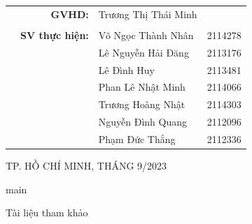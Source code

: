 \documentclass[a4paper]{article}
\begin{document}
\begin{titlepage}
\begin{table}[h]
\begin{tabular}{rrll}
\hspace{4cm} & \textbf{GVHD:} & Trương Thị Thái Minh \\
\\
& \textbf{SV thực hiện:} & Võ Ngọc Thành Nhân & 2114278 \\
& & Lê Nguyễn Hải Đăng & 2113176 \\
& & Lê Đình Huy & 2113481 \\
& & Phan Lê Nhật Minh & 2114066 \\
& & Trương Hoàng Nhật & 2114303 \\
& & Nguyễn Đình Quang & 2112096 \\
& & Phạm Đức Thắng & 2112336 \\
\end{tabular}
\end{table}

\begin{center}
{\footnotesize TP. HỒ CHÍ MINH, THÁNG 9/2023}
\end{center}
\end{titlepage}

\thispagestyle{empty}

\newpage
\tableofcontents
\newpage


{main}
	

 \newpage
\begin{thebibliography}{80}

 Tài liệu tham khảo
 
 \end{thebibliography}
\end{document}
